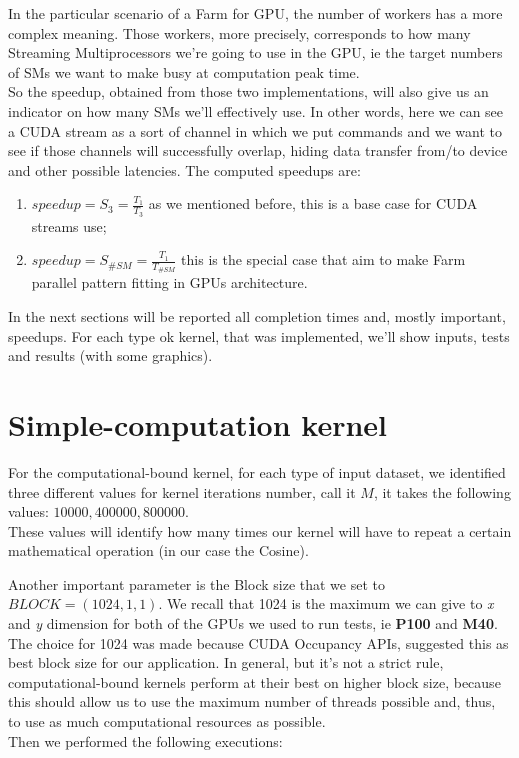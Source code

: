 In the particular scenario of a Farm for GPU, the number of workers has a more complex meaning. Those workers, more precisely, corresponds to how many Streaming Multiprocessors we're going to use in the GPU, ie the target numbers of SMs we want to make busy at computation peak time.\\
So the speedup, obtained from those two implementations, will also give us an indicator on how many SMs we'll effectively use.
In other words, here we can see a CUDA stream as a sort of channel in which we put commands and we want to see if those channels will successfully overlap, hiding data transfer from/to device and other possible latencies.
The computed speedups are:
\begin{enumerate}
	\item \(speedup = S_{3} = \frac{T_{1}}{T_{3}} \) as we mentioned before, this is a base case for CUDA streams use;
	\item \(speedup = S_{\#SM} = \frac{T_{1}}{T_{\#SM}} \) this is the special case that aim to make Farm parallel pattern fitting in GPUs architecture.
\end{enumerate}

In the next sections will be reported all completion times and, mostly important, speedups. 
For each type ok kernel, that was implemented,  we'll show inputs, tests and results (with some graphics).




\section{Simple-computation kernel}
For the computational-bound kernel, for each type of input dataset, we identified three different values for kernel iterations number, call it \(M\), it takes the following values: \(10 000, 400 000, 800 000\).\\
These values will identify how many times our kernel will have to repeat a certain mathematical operation (in our case the Cosine).

Another important parameter is the Block size that we set to \(BLOCK = (1024, 1, 1)\). We recall that 1024 is the maximum we can give to \textit{x} and \textit{y} dimension for both of the GPUs we used to run tests, ie \textbf{P100} and \textbf{M40}.\\
The choice for 1024 was made because CUDA Occupancy APIs, suggested this as best block size for our application. In general, but it's not a strict rule, computational-bound kernels perform at their best on higher block size, because this should allow us to use the maximum number of threads possible and, thus, to use as much computational resources as possible.\\
Then we performed the following executions:


